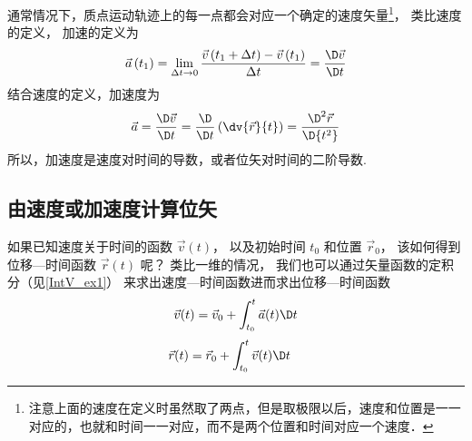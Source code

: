 通常情况下，质点运动轨迹上的每一点都会对应一个确定的速度矢量\footnote{注意上面的速度在定义时虽然取了两点，但是取极限以后，速度和位置是一一对应的，也就和时间一一对应，而不是两个位置和时间对应一个速度．}， 类比速度的定义， 加速的定义为
\begin{equation}
\vec a\left( {{t_1}} \right) = \mathop {\lim }\limits_{\Delta t \to 0} \frac{{\vec v\left( {{t_1} + \Delta t} \right) - \vec v\left( {{t_1}} \right)}}{{\Delta t}} = \frac{{\D \vec v}}{{\D t}}
\end{equation}
结合速度的定义，加速度为
\begin{equation}
\vec a = \frac{{\D \vec v}}{\D t} = \frac{\D }{{\D t}}\left(\dv{\vec r}{t}\right) = \frac{{{\D ^2}\vec r}}{{\D {t^2}}}
\end{equation}
所以，加速度是速度对时间的导数，或者位矢对时间的二阶导数.

\subsection{由速度或加速度计算位矢}

如果已知速度关于时间的函数 $\vec v(t)$， 以及初始时间 $t_0$ 和位置 $\vec r_0$， 该如何得到位移—时间函数 $\vec r(t)$ 呢？ 类比一维的情况， 我们也可以通过矢量函数的定积分（见\autoref{IntV_ex1}） 来求出速度—时间函数进而求出位移—时间函数
\begin{equation}\label{VnA_eq7}
\vec v(t) = \vec v_0 + \int_{t_0}^{t} \vec a(t) \D t
\end{equation}
\begin{equation}\label{VnA_eq8}
\begin{aligned}
\vec r(t) &= \vec r_0 + \int_{t_0}^{t} \vec v(t) \D t
\end{aligned}\end{equation}










